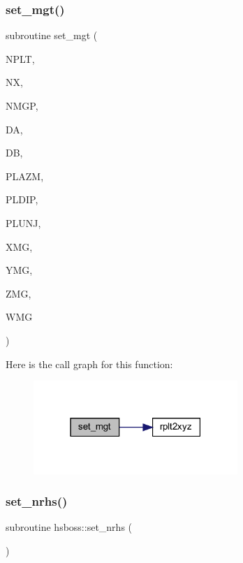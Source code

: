 \subsubsection{\texorpdfstring{set\+\_\+mgt()}{set\_mgt()}}
{\footnotesize\ttfamily subroutine set\+\_\+mgt (\begin{DoxyParamCaption}\item[{integer}]{N\+P\+LT,  }\item[{integer}]{NX,  }\item[{integer}]{N\+M\+GP,  }\item[{real, dimension(nplt)}]{DA,  }\item[{real, dimension(nplt)}]{DB,  }\item[{real, dimension(nplt)}]{P\+L\+A\+ZM,  }\item[{real, dimension(nplt)}]{P\+L\+D\+IP,  }\item[{real, dimension(nplt)}]{P\+L\+U\+NJ,  }\item[{real, dimension (nmgp,nplt)}]{X\+MG,  }\item[{real, dimension (nmgp,nplt)}]{Y\+MG,  }\item[{real, dimension (nmgp,nplt)}]{Z\+MG,  }\item[{real, dimension(nplt)}]{W\+MG }\end{DoxyParamCaption})}

Here is the call graph for this function\+:\nopagebreak
\begin{figure}[H]
\begin{center}
\leavevmode
\includegraphics[width=219pt]{Leroi__c_8f90_a820f6bd31435032872330d97a6fdf404_cgraph}
\end{center}
\end{figure}
\mbox{\label{Leroi__c_8f90_a5e91ef1c525aed4231141372759cca43}} 
\subsubsection{\texorpdfstring{set\+\_\+nrhs()}{set\_nrhs()}}
{\footnotesize\ttfamily subroutine hsboss\+::set\+\_\+nrhs (\begin{DoxyParamCaption}{ }\end{DoxyParamCaption})}

